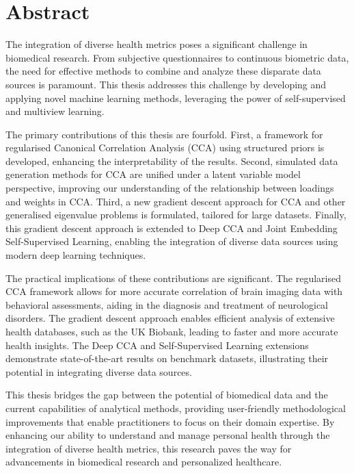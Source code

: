 \chapter*{Abstract}

The integration of diverse health metrics poses a significant challenge in biomedical research. From subjective questionnaires to continuous biometric data, the need for effective methods to combine and analyze these disparate data sources is paramount. This thesis addresses this challenge by developing and applying novel machine learning methods, leveraging the power of self-supervised and multiview learning.

The primary contributions of this thesis are fourfold. First, a framework for regularised Canonical Correlation Analysis (CCA) using structured priors is developed, enhancing the interpretability of the results. Second, simulated data generation methods for CCA are unified under a latent variable model perspective, improving our understanding of the relationship between loadings and weights in CCA. Third, a new gradient descent approach for CCA and other generalised eigenvalue problems is formulated, tailored for large datasets. Finally, this gradient descent approach is extended to Deep CCA and Joint Embedding Self-Supervised Learning, enabling the integration of diverse data sources using modern deep learning techniques.

The practical implications of these contributions are significant. The regularised CCA framework allows for more accurate correlation of brain imaging data with behavioral assessments, aiding in the diagnosis and treatment of neurological disorders. The gradient descent approach enables efficient analysis of extensive health databases, such as the UK Biobank, leading to faster and more accurate health insights. The Deep CCA and Self-Supervised Learning extensions demonstrate state-of-the-art results on benchmark datasets, illustrating their potential in integrating diverse data sources.

This thesis bridges the gap between the potential of biomedical data and the current capabilities of analytical methods, providing user-friendly methodological improvements that enable practitioners to focus on their domain expertise. By enhancing our ability to understand and manage personal health through the integration of diverse health metrics, this research paves the way for advancements in biomedical research and personalized healthcare.